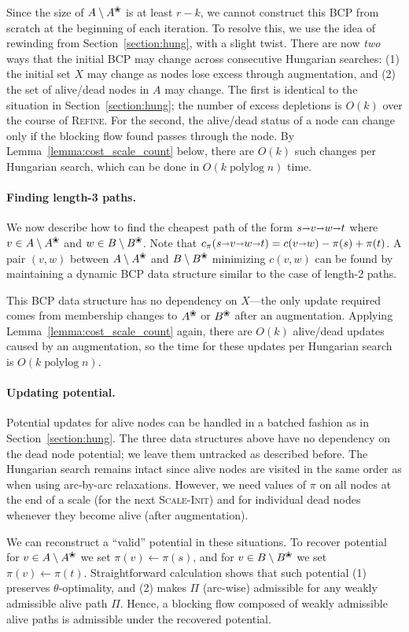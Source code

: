 \documentclass[11pt,twoside]{article}
\makeatletter
\def\polylog{\mathop{\mathrm{polylog}}}
\def\arcto{\mathord\shortrightarrow}
\def\arc#1#2{#1\arcto#2}
\def\alive#1{{#1}^\text{\ding{96}}}
\def\dead#1{{#1} \setminus \alive{#1}}
\theoremstyle{plain}
\numberwithin{figure}{section}
\renewcommand{\subparagraph}{\paragraph}
\def\n@te#1{\textsf{\boldmath \textbf{$\langle\!\langle$#1$\rangle\!\rangle$}}\leavevmode}
\def\note#1{\textcolor{red}{\n@te{#1}}}
\makeatother
\begin{document}
Since the size of $\dead{A}$ is at least $r-k$, we cannot
construct this BCP from scratch at the beginning of each iteration.
To resolve this, we use the idea of rewinding from Section~\ref{section:hung},
with a slight twist.
There are now \emph{two} ways that the initial BCP may change across
consecutive Hungarian searches: (1) the initial set $X$ may change as nodes
lose excess through augmentation, and (2) the set of alive/dead nodes in $A$ may
change.
The first is identical to the situation in Section~\ref{section:hung};
the number of excess depletions is $O(k)$ over the course of \textsc{Refine}.
For the second, the alive/dead status of a node can change only if the
blocking flow found passes through the node.
By Lemma~\ref{lemma:cost_scale_count} below, there are $O(k)$ such changes per Hungarian search,
which can be done in $O(k\polylog n)$ time.

\subparagraph{Finding length-3 paths.}
We now describe how to find the cheapest path of the form $s \arcto v \arcto w \arcto t$
where $v \in \dead{A}$ and $w \in \dead{B}$.
Note that $c_\pi(s \arcto v \arcto w \arcto t) = c(\arc vw) - \pi(s) + \pi(t)$.
A pair $(v, w)$ between $\dead{A}$ and $\dead{B}$ minimizing $c(v, w)$
can be found by maintaining a dynamic BCP data structure similar to the
case of length-2 paths.

This BCP data structure has no dependency on $X$---the only update required comes from
membership changes to $\alive{A}$ or $\alive{B}$ after an augmentation.
Applying Lemma~\ref{lemma:cost_scale_count} again,
there are $O(k)$ alive/dead updates caused by an augmentation, so the time for
these updates per Hungarian search is $O(k\polylog n)$.

\subparagraph{Updating potential.}
Potential updates for alive nodes can be handled in a batched fashion as in Section~\ref{section:hung}.
The three data structures above have no dependency on the dead node potential;
we leave them untracked as described before.
The Hungarian search remains intact since alive nodes are visited
in the same order as when using arc-by-arc relaxations.
However, we need values of $\pi$ on all nodes at the end of a scale (for the
next \textsc{Scale-Init}) and for individual dead nodes whenever they become
alive (after augmentation).

We can reconstruct a ``valid'' potential in these situations.
To recover potential for $v \in \dead{A}$ we set $\pi(v) \gets \pi(s)$,
and for $v \in \dead{B}$ we set $\pi(v) \gets \pi(t)$.
Straightforward calculation shows that such potential (1) preserves $\theta$-optimality,
and (2) makes $\Pi$ (arc-wise) admissible for any weakly admissible alive path $\Pi$.
Hence, a blocking flow composed of weakly admissible alive paths is admissible
under the recovered potential.
\end{document}
